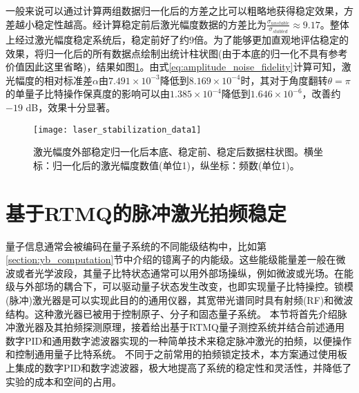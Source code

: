 一般来说可以通过计算两组数据归一化后的方差之比可以粗略地获得稳定效果，方差越小稳定性越高。经计算稳定前后激光幅度数据的方差比为$\frac{\sigma_{unstable}}{\sigma_{stabled}}\approx 9.17$。整体上经过激光幅度稳定系统后，稳定前好了约9倍。为了能够更加直观地评估稳定的效果，将归一化后的所有数据点绘制出统计柱状图(由于本底的归一化不具有参考价值因此这里省略)，结果如图\ref{fig:laser_stabilization_data1}。由式\eqref{eq:amplitude_noise_fidelity}计算可知，激光幅度的相对标准差$\alpha$由$7.491\times 10^{-3}$降低到$8.169\times 10^{-4}$时，其对于角度翻转$\theta=\pi$的单量子比特操作保真度的影响可以由$1.385\times 10^{-4}$降低到$1.646\times 10^{-6}$，改善约$-19$ dB，效果十分显著。


\begin{figure}
    \centering
    \texttt{[image: laser\_stabilization\_data1]}
    \caption[激光幅度外部稳定柱状图对比数据]{激光幅度外部稳定归一化后本底、稳定前、稳定后数据柱状图。横坐标：归一化后的激光幅度数值(单位1)，纵坐标：频数(单位1)。\label{fig:laser_stabilization_data1}}
\end{figure}










\newpage
\section[基于RTMQ的脉冲激光拍频稳定]{基于RTMQ的脉冲激光拍频稳定\label{section:pulsed_laser_locking}}

量子信息通常会被编码在量子系统的不同能级结构中，比如第\ref{section:yb_computation}节中介绍的镱离子的内能级。这些能级能量差一般在微波或者光学波段，其量子比特状态通常可以用外部场操纵，例如微波或光场。在能级与外部场的耦合下，可以驱动量子状态发生改变，也即实现量子比特操控。锁模(脉冲)激光器是可以实现此目的的通用仪器，其宽带光谱同时具有射频(RF)和微波结构。这种激光器已被用于控制原子\cite[]{Hayes_Matsukevich_Maunz_Hucul_Quraishi_Olmschenk_Campbell_Mizrahi_Senko_Monroe_2010}、分子\cite[]{Peer_Shapiro_Stowe_Shapiro_Ye_2007}和固态量子系统\cite[]{Greve_Press_McMahon_Yamamoto_2013}。
本节将首先介绍脉冲激光器及其拍频探测原理，接着给出基于RTMQ量子测控系统并结合前述通用数字PID和通用数字滤波器实现的一种简单技术来稳定脉冲激光的拍频，以便操作和控制通用量子比特系统\cite[]{ladd2010quantum}。
不同于之前常用的拍频锁定技术\cite[]{Islam_Campbell_Choi_Clark_Conover_Debnath_Edwards_Fields_Hayes_Hucul_et_al_2014}，本方案通过使用板上集成的数字PID和数字滤波器，极大地提高了系统的稳定性和灵活性，并降低了实验的成本和空间的占用。


